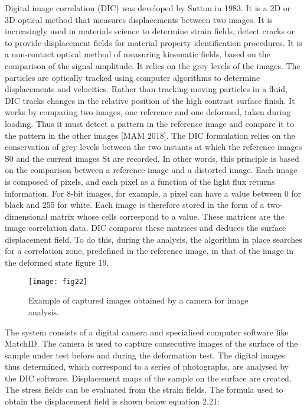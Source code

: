 Digital image correlation (DIC) was developed by Sutton in 1983. It is a 2D or 3D optical method that measures displacements between two images. It is increasingly used in materials science to determine strain fields, detect cracks or to provide displacement fields for material property identification procedures. It is a non-contact optical method of measuring kinematic fields, based on the comparison of the signal amplitude. It relies on the grey levels of the images. The particles are optically tracked using computer algorithms to determine displacements and velocities. Rather than tracking moving particles in a fluid, DIC tracks changes in the relative position of the high contrast surface finish. It works by comparing two images, one reference and one deformed, taken during loading. Thus it must detect a pattern in the reference image and compare it to the pattern in the other images [MAM 2018]. The DIC formulation relies on the conservation of grey levels between the two instants at which the reference images S0 and the current images St are recorded. In other words, this principle is based on the comparison between a reference image and a distorted image. Each image is composed of pixels, and each pixel as a function of the light flux returns information. For 8-bit images, for example, a pixel can have a value between 0 for black and 255 for white. Each image is therefore stored in the form of a two-dimensional matrix whose cells correspond to a value. These matrices are the image correlation data. DIC compares these matrices and deduces the surface displacement field. To do this, during the analysis, the algorithm in place searches for a correlation zone, predefined in the reference image, in that of the image in the deformed state figure 19.

\graphicspath{{Images/}}
\begin{figure}[htp]
	\centering
	\texttt{[image: fig22]}
	\caption{Example of captured images obtained by a camera for image analysis.}
	\label{fig:galaxy}
\end{figure}

The system consists of a digital camera and specialised computer software like MatchID. The camera is used to capture consecutive images of the surface of the sample under test before and during the deformation test. The digital images thus determined, which correspond to a series of photographs, are analysed by the DIC software. Displacement maps of the sample on the surface are created. The stress fields can be evaluated from the strain fields. The formula used to obtain the displacement field is shown below equation 2.21:

